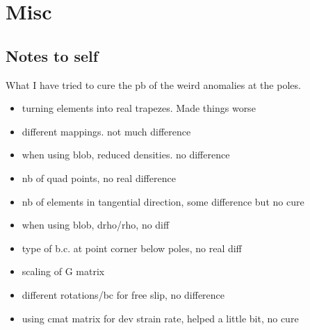 \documentclass[a4paper,12pt]{article}
\begin{document}
\cite{krhb12}


\newpage
\appendix
\section{Misc}

\subsection{Notes to self}

What I have tried to cure the pb of the weird anomalies at the poles.

\begin{itemize}
\item turning elements into real trapezes. Made things worse
\item different mappings. not much difference
\item when using blob, reduced densities. no difference
\item nb of quad points, no real difference
\item nb of elements in tangential direction, some difference but no cure 
\item when using blob, drho/rho, no diff 
\item type of b.c. at point corner below poles, no real diff 
\item scaling of G matrix
\item different rotations/bc for free slip, no difference
\item using cmat matrix for dev strain rate, helped a little bit, no cure 
\end{itemize}



\end{document}
